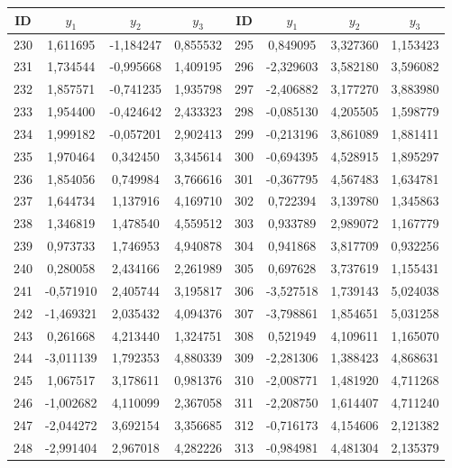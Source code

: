 \begin{apendicesenv}
\begin{table}[H]
	\centering
	\scriptsize
	\begin{tabular}{c c c c c c c c}
		\toprule
		 \centering \textbf{ID} & $y_1$ & $y_2$ & $y_3$ & \textbf{ID} & $y_1$ & $y_2$ & $y_3$ \\
		\midrule
		230 & 1,611695 & -1,184247 & 0,855532 & 295 & 0,849095 & 3,327360 & 1,153423 \\
		231 & 1,734544 & -0,995668 & 1,409195 & 296 & -2,329603 & 3,582180 & 3,596082 \\
		232 & 1,857571 & -0,741235 & 1,935798 & 297 & -2,406882 & 3,177270 & 3,883980 \\
		233 & 1,954400 & -0,424642 & 2,433323 & 298 & -0,085130 & 4,205505 & 1,598779 \\
		234 & 1,999182 & -0,057201 & 2,902413 & 299 & -0,213196 & 3,861089 & 1,881411 \\
		235 & 1,970464 & 0,342450 & 3,345614 & 300 & -0,694395 & 4,528915 & 1,895297 \\
		236 & 1,854056 & 0,749984 & 3,766616 & 301 & -0,367795 & 4,567483 & 1,634781 \\
		237 & 1,644734 & 1,137916 & 4,169710 & 302 & 0,722394 & 3,139780 & 1,345863 \\
		238 & 1,346819 & 1,478540 & 4,559512 & 303 & 0,933789 & 2,989072 & 1,167779 \\
		239 & 0,973733 & 1,746953 & 4,940878 & 304 & 0,941868 & 3,817709 & 0,932256 \\
		240 & 0,280058 & 2,434166 & 2,261989 & 305 & 0,697628 & 3,737619 & 1,155431 \\
		241 & -0,571910 & 2,405744 & 3,195817 & 306 & -3,527518 & 1,739143 & 5,024038 \\
		242 & -1,469321 & 2,035432 & 4,094376 & 307 & -3,798861 & 1,854651 & 5,031258 \\
		243 & 0,261668 & 4,213440 & 1,324751 & 308 & 0,521949 & 4,109611 & 1,165070 \\
		244 & -3,011139 & 1,792353 & 4,880339 & 309 & -2,281306 & 1,388423 & 4,868631 \\
		245 & 1,067517 & 3,178611 & 0,981376 & 310 & -2,008771 & 1,481920 & 4,711268 \\
		246 & -1,002682 & 4,110099 & 2,367058 & 311 & -2,208750 & 1,614407 & 4,711240 \\
		247 & -2,044272 & 3,692154 & 3,356685 & 312 & -0,716173 & 4,154606 & 2,121382 \\
		248 & -2,991404 & 2,967018 & 4,282226 & 313 & -0,984981 & 4,481304 & 2,135379 \\

\end{tabular}
\end{table}
\end{apendicesenv}
